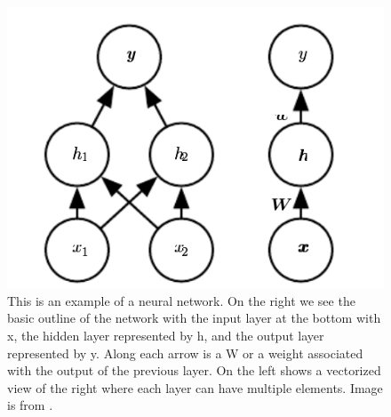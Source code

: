     
\begin{figure}[tbh]
\centering
\includegraphics[width=\textwidth]{neural_network.png}
\caption{This is an example of a neural network. On the right we see the basic outline of the network with the input layer at the bottom with x, the hidden layer represented by h, and the output layer represented by y. Along each arrow is a W or a weight associated with the output of the previous layer. On the left shows a vectorized view of the right where each layer can have multiple elements. Image is from \cite{Goodfellow-et-al-2016}.}
\label{fig_neuralNetwork}
\end{figure}    



